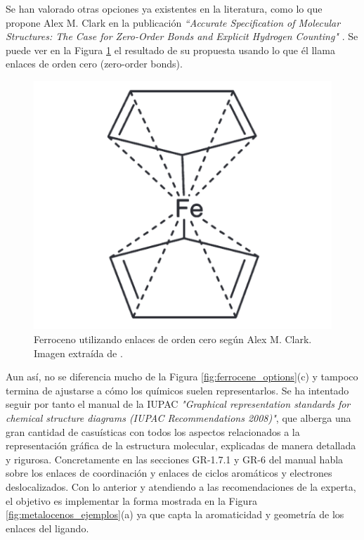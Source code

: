 Se han valorado otras opciones ya existentes en la literatura, como lo que propone Alex M. Clark en la publicación \textit{``Accurate Specification of Molecular Structures: The Case for Zero-Order Bonds and Explicit Hydrogen Counting"} \cite{zero_order}. Se puede ver en la Figura \ref{fig:zero_bond_ferrocene} el resultado de su propuesta usando lo que él llama enlaces de orden cero (zero-order bonds). 
\begin{figure}[h!]
    \centering
    \includegraphics[scale=0.4]{imagenes/diseno/dibujo/zero_bond_orders_ferrocene.png}
    \caption{Ferroceno utilizando enlaces de orden cero según Alex M. Clark. Imagen extraída de \cite{zero_order}.}
    \label{fig:zero_bond_ferrocene}
\end{figure}

Aun así, no se diferencia mucho de la Figura \ref{fig:ferrocene_options}(c) y tampoco termina de ajustarse a cómo los químicos suelen representarlos. Se ha intentado seguir por tanto el manual de la IUPAC \textit{"Graphical representation standards for chemical structure diagrams (IUPAC Recommendations 2008)"}\cite{iupac_manual}, que alberga una gran cantidad de casuísticas con todos los aspectos relacionados a la representación gráfica de la estructura molecular, explicadas de manera detallada y rigurosa. Concretamente en las secciones GR-1.7.1 y GR-6 del manual habla sobre los enlaces de coordinación y enlaces de ciclos aromáticos y electrones deslocalizados. Con lo anterior y atendiendo a las recomendaciones de la experta, el objetivo es implementar la forma mostrada en la Figura \ref{fig:metalocenos_ejemplos}(a) ya que capta la aromaticidad y geometría de los enlaces del ligando.


